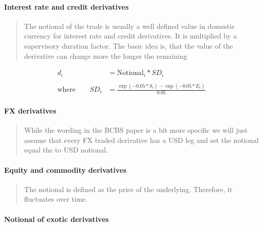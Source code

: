 \hypertarget{interest-rate-and-credit-derivatives}{%
\paragraph{Interest rate and credit
derivatives}\label{interest-rate-and-credit-derivatives}}

\begin{quote}
The notional of the trade is usually a well defined value in domestic
currency for interest rate and credit derivatives. It is multiplied by a
supervisory duration factor. The basic idea is, that the value of the
derivative can change more the longer the remaining
\end{quote}

\begin{align*}
d_i &= \text{Notional}_i * SD_i \\
\\
\text{where} \qquad SD_i &=\frac{\exp\left(-0.05 * S_i\right)-\exp\left(-0.05 * E_i\right)}{0.05}
\end{align*}

\hypertarget{fx-derivatives}{%
\paragraph{FX derivatives}\label{fx-derivatives}}

\begin{quote}
While the wording in the BCBS paper is a bit more specific we will just
assume that every FX traded derivative has a USD leg and set the
notional equal the to USD notional.
\end{quote}

\hypertarget{equity-and-commodity-derivatives}{%
\paragraph{Equity and commodity
derivatives}\label{equity-and-commodity-derivatives}}

\begin{quote}
The notional is defined as the price of the underlying. Therefore, it
fluctuates over time.
\end{quote}

\hypertarget{notional-of-exotic-derivatives}{%
\paragraph{Notional of exotic
derivatives}\label{notional-of-exotic-derivatives}}

